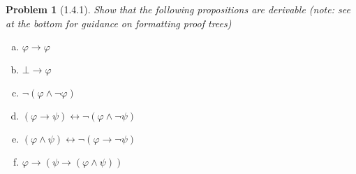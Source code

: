 \documentclass[letter]{article}
\newtheorem{problem}{Problem}
\theoremstyle{definition}
\begin{document}
\begin{problem}[1.4.1] Show that the following propositions are derivable (note: see at the bottom for guidance on formatting proof trees)
\begin{enumerate}[(a)]
    \item $\varphi \to \varphi$
    \item $\bot \to \varphi$
    \item $\neg (\varphi \land \neg \varphi)$
    \item $(\varphi \to \psi) \leftrightarrow \neg (\varphi \land \neg \psi)$
    \item $(\varphi \land \psi) \leftrightarrow \neg (\varphi \to \neg \psi)$
    \item $\varphi \to (\psi \to (\varphi \land \psi))$
\end{enumerate}
\end{problem}
\end{document}
